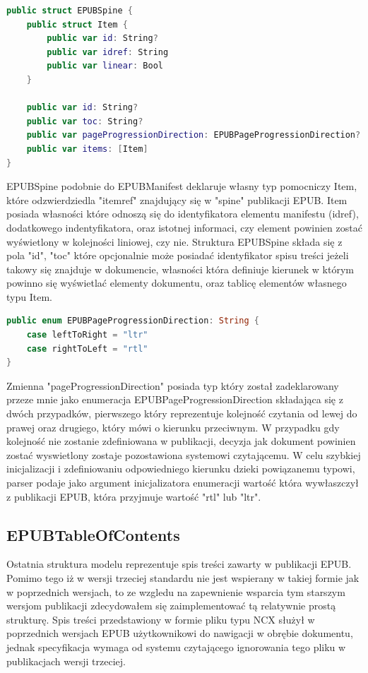 \begin{lstlisting}[caption={Struktura EPUBSpine.}, language=swift]
public struct EPUBSpine {
    public struct Item {
        public var id: String?
        public var idref: String
        public var linear: Bool
    }

    public var id: String?
    public var toc: String?
    public var pageProgressionDirection: EPUBPageProgressionDirection?
    public var items: [Item]
}
\end{lstlisting}

EPUBSpine podobnie do EPUBManifest deklaruje własny typ pomocniczy Item, które odzwierdziedla "itemref" znajdujący się w "spine" publikacji EPUB. Item posiada własności które odnoszą się do identyfikatora elementu manifestu (idref), dodatkowego indentyfikatora, oraz istotnej informaci, czy element powinien zostać wyświetlony w kolejności liniowej, czy nie. Struktura EPUBSpine składa się z pola "id", "toc" które opcjonalnie może posiadać identyfikator spisu treści jeżeli takowy się znajduje w dokumencie, własności która definiuje kierunek w którym powinno się wyświetlać elementy dokumentu, oraz tablicę elementów własnego typu Item.

\begin{lstlisting}[language=swift]
public enum EPUBPageProgressionDirection: String {
    case leftToRight = "ltr"
    case rightToLeft = "rtl"
}
\end{lstlisting}

Zmienna "pageProgressionDirection" posiada typ który został zadeklarowany przeze mnie jako enumeracja EPUBPageProgressionDirection składająca się z dwóch przypadków, pierwszego który reprezentuje kolejność czytania od lewej do prawej oraz drugiego, który mówi o kierunku przeciwnym. W przypadku gdy kolejność nie zostanie zdefiniowana w publikacji, decyzja jak dokument powinien zostać wyswietlony zostaje pozostawiona systemowi czytającemu. W celu szybkiej inicjalizacji i zdefiniowaniu odpowiedniego kierunku dzieki powiązanemu typowi, parser podaje jako argument inicjalizatora enumeracji wartość która wywłaszczył z publikacji EPUB, która przyjmuje wartość "rtl" lub "ltr".

\subsection{EPUBTableOfContents}

Ostatnia struktura modelu reprezentuje spis treści zawarty w publikacji EPUB. Pomimo tego iż w wersji trzeciej standardu nie jest wspierany w takiej formie jak w poprzednich wersjach, to ze wzgledu na zapewnienie wsparcia tym starszym wersjom publikacji zdecydowałem się zaimplementować tą relatywnie prostą strukturę. Spis treści przedstawiony w formie pliku typu NCX służył w poprzednich wersjach EPUB użytkownikowi do nawigacji w obrębie dokumentu, jednak specyfikacja wymaga od systemu czytającego ignorowania tego pliku w publikacjach wersji trzeciej.

